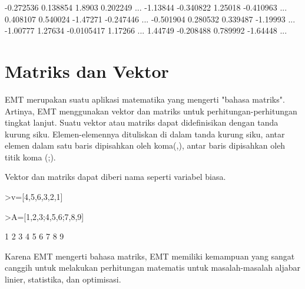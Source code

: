 \documentclass{article}
\newenvironment{eulernotebook}{\par}{\par}
\newcommand{\eulerheading}[1]{\section{#1}}
\newenvironment{eulercomment}{\par\medskip}{\par\medskip}
\begin{document}
\begin{eulernotebook}
\begin{euleroutput}
      -0.272536      0.138854        1.8903      0.202249     ...
       -1.13844     -0.340822       1.25018     -0.410963     ...
       0.408107      0.540024      -1.47271     -0.247446     ...
      -0.501904      0.280532      0.339487      -1.19993     ...
       -1.00777       1.27634    -0.0105417       1.17266     ...
        1.44749     -0.208488      0.789992      -1.64448     ...
\end{euleroutput}
\eulerheading{Matriks dan Vektor}
\begin{eulercomment}
EMT merupakan suatu aplikasi matematika yang mengerti "bahasa matriks". Artinya,
EMT menggunakan vektor dan matriks untuk perhitungan-perhitungan tingkat lanjut.
Suatu vektor atau matriks dapat didefinisikan dengan tanda kurung siku.
Elemen-elemennya dituliskan di dalam tanda kurung siku, antar elemen dalam satu
baris dipisahkan oleh koma(,), antar baris dipisahkan oleh titik koma (;).

Vektor dan matriks dapat diberi nama seperti variabel biasa.
\end{eulercomment}
\begin{eulerprompt}
>v=[4,5,6,3,2,1]
\end{eulerprompt}
\begin{euleroutput}
  [4,  5,  6,  3,  2,  1]
\end{euleroutput}
\begin{eulerprompt}
>A=[1,2,3;4,5,6;7,8,9]
\end{eulerprompt}
\begin{euleroutput}
              1             2             3 
              4             5             6 
              7             8             9 
\end{euleroutput}
\begin{eulercomment}
Karena EMT mengerti bahasa matriks, EMT memiliki kemampuan yang sangat canggih
untuk melakukan perhitungan matematis untuk masalah-masalah aljabar linier,
statistika, dan optimisasi.


\end{eulercomment}
\end{eulernotebook}
\end{document}
